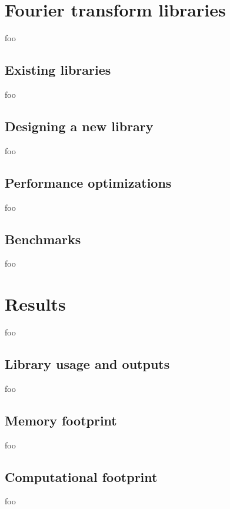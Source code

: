 \documentclass[letter,12pt,notitlepage]{article}
\begin{document}
\section{Fourier transform libraries}
\label{sec:libraries}

foo

\subsection{Existing libraries}

foo

\subsection{Designing a new library}

foo

\subsection{Performance optimizations}

foo

\subsection{Benchmarks}

foo

\vfill
\clearpage

\section{Results}
\label{sec:results}

foo

\subsection{Library usage and outputs}

foo

\subsection{Memory footprint}

foo

\subsection{Computational footprint}

foo
\end{document}
